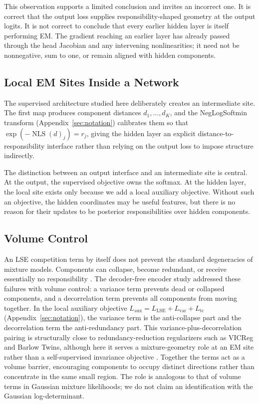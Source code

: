 This observation supports a limited conclusion and invites an incorrect one.
It is correct that the output loss supplies responsibility-shaped geometry at
the output logits. It is not correct to conclude that every earlier hidden
layer is itself performing EM. The gradient reaching an earlier layer has
already passed through the head Jacobian and any intervening nonlinearities;
it need not be nonnegative, sum to one, or remain aligned with hidden
components.

\subsection{Local EM Sites Inside a Network}
The supervised architecture studied here deliberately creates an intermediate
site. The first map produces component distances $d_1,\ldots,d_K$, and the
NegLogSoftmin transform (Appendix~\ref{sec:notation}) calibrates them so that
$\exp(-\operatorname{NLS}(d)_j)=r_j$, giving the hidden layer an explicit
distance-to-responsibility interface rather than relying on the output loss to
impose structure indirectly.

The distinction between an output interface and an intermediate site is
central. At the output, the supervised objective owns the softmax. At the
hidden layer, the local site exists only because we add a local auxiliary
objective. Without such an objective, the hidden coordinates may be useful
features, but there is no reason for their updates to be posterior
responsibilities over hidden components.

\subsection{Volume Control}
An LSE competition term by itself does not prevent the standard degeneracies
of mixture models. Components can collapse, become redundant, or receive
essentially no responsibility \citep{redner1984mixture,mclachlan2000finite}.
The decoder-free encoder study addressed these failures with volume control: a
variance term prevents dead or collapsed components, and a decorrelation term
prevents all components from moving together. In the local auxiliary objective
$L_{\mathrm{aux}}=L_{\mathrm{LSE}}+L_{\mathrm{var}}+L_{\mathrm{tc}}$
(Appendix~\ref{sec:notation}), the variance term is the anti-collapse part and
the decorrelation term the anti-redundancy part. This variance-plus-decorrelation
pairing is structurally close to redundancy-reduction regularizers such as
VICReg and Barlow Twins, although here it serves a mixture-geometry role at an
EM site rather than a self-supervised invariance objective
\citep{bardes2022vicreg,zbontar2021barlow}. Together the terms act as a volume
barrier, encouraging components to occupy distinct directions rather than
concentrate in the same small region. The role is analogous to that of volume
terms in Gaussian mixture likelihoods; we do not claim an identification with
the Gaussian log-determinant.

